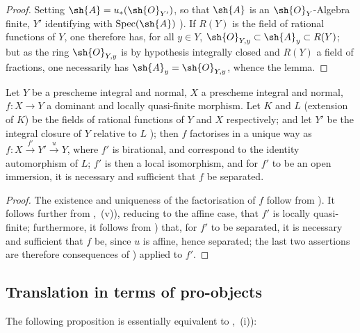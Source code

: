 \begin{proof}
Setting $\sh{A}=u_*(\sh{O}_{Y'})$, so that $\sh{A}$ is an $\sh{O}_Y$-Algebra finite, $Y'$ identifying with $\operatorname{Spec}(\sh{A})$ ).
If $R(Y)$ is the field of rational functions of $Y$, one therefore has, for all $y\in Y$, $\sh{O}_{Y,y}\subset\sh{A}_y\subset R(Y)$; but as the ring $\sh{O}_{Y,y}$ is by hypothesis integrally closed and $R(Y)$ a field of fractions, one necessarily has $\sh{A}_y=\sh{O}_{Y,y}$, whence the lemma.
\end{proof}

\begin{corollary}[8.12.11]
\label{IV.8.12.11}
Let $Y$ be a prescheme integral and normal, $X$ a prescheme integral and normal, $f:X\to Y$ a dominant and locally quasi-finite morphism.
Let $K$ and $L$ (extension of $K$) be the fields of rational functions of $Y$ and $X$ respectively; and let $Y'$ be the integral closure of $Y$ relative to $L$ ); then $f$ factorises in a unique way as $f:X\xrightarrow{f'}Y'\xrightarrow{u}Y$, where $f'$ is birational, and correspond to the identity automorphism of $L$; $f'$ is then a local isomorphism, and for $f'$ to be an open immersion, it is necessary and sufficient that $f$ be separated.
\end{corollary}

\begin{proof}
The existence and uniqueness of the factorisation of $f$ follow from ).
It follows further from ,~(v)), reducing to the affine case, that $f'$ is locally quasi-finite; furthermore, it follows from ) that, for $f'$ to be separated, it is necessary and sufficient that $f$ be, since $u$ is affine, hence separated; the last two assertions are therefore consequences of ) applied to $f'$.
\end{proof}

\subsection{Translation in terms of pro-objects}
\label{subsection:IV.8.13}


The following proposition is essentially equivalent to ,~(i)):

